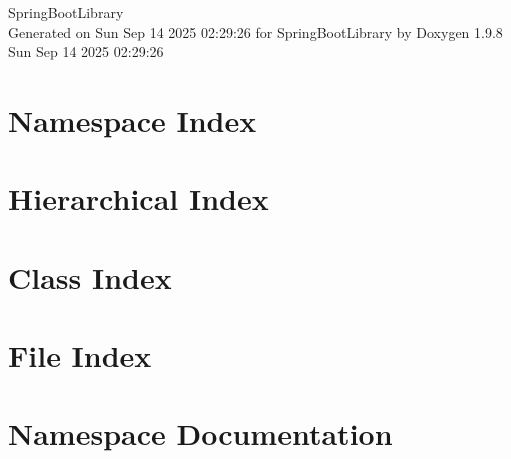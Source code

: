 \documentclass[twoside]{book}
\newcommand{\+}{\discretionary{\mbox{\scriptsize$\hookleftarrow$}}{}{}}
\newcommand{\clearemptydoublepage}{%
    \newpage{\pagestyle{empty}\cleardoublepage}%
  }
\begin{document}
  \raggedbottom
    \hypersetup{pageanchor=false,
                bookmarksnumbered=true,
                pdfencoding=unicode
               }
  \begin{titlepage}
  \vspace*{7cm}
  \begin{center}%
  {\Large Spring\+Boot\+Library}\\
  \vspace*{1cm}
  {\large Generated on Sun Sep 14 2025 02\+:29\+:26 for Spring\+Boot\+Library by Doxygen 1.9.8}\\
    \vspace*{0.5cm}
    {\small Sun Sep 14 2025 02:29:26}
  \end{center}
  \end{titlepage}
  \clearemptydoublepage
  \tableofcontents
  \clearemptydoublepage
  \hypersetup{pageanchor=true}

\chapter{Namespace Index}

\chapter{Hierarchical Index}

\chapter{Class Index}

\chapter{File Index}

\chapter{Namespace Documentation}









\end{document}
